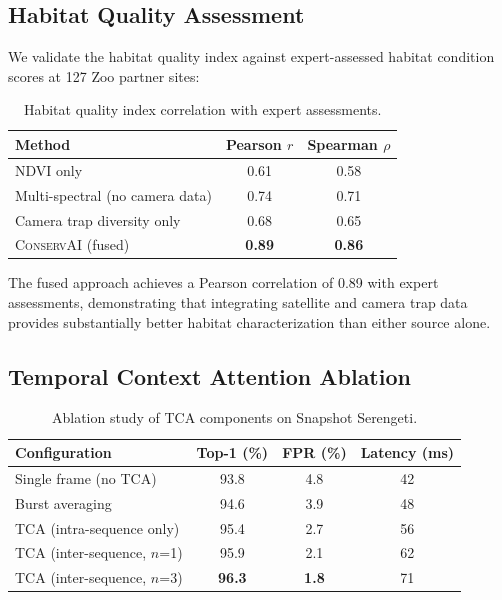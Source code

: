 \documentclass[11pt,letterpaper]{article}
\newcommand{\ConservAI}{\textsc{ConservAI}}
\begin{document}
\subsection{Habitat Quality Assessment}

We validate the habitat quality index against expert-assessed habitat condition scores at 127 Zoo partner sites:

\begin{table}[htbp]
\centering
\caption{Habitat quality index correlation with expert assessments.}
\label{tab:habitat}
\begin{tabular}{lcc}
\toprule
\textbf{Method} & \textbf{Pearson $r$} & \textbf{Spearman $\rho$} \\
\midrule
NDVI only & 0.61 & 0.58 \\
Multi-spectral (no camera data) & 0.74 & 0.71 \\
Camera trap diversity only & 0.68 & 0.65 \\
\ConservAI{} (fused) & \textbf{0.89} & \textbf{0.86} \\
\bottomrule
\end{tabular}
\end{table}

The fused approach achieves a Pearson correlation of 0.89 with expert assessments, demonstrating that integrating satellite and camera trap data provides substantially better habitat characterization than either source alone.

\subsection{Temporal Context Attention Ablation}

\begin{table}[htbp]
\centering
\caption{Ablation study of TCA components on Snapshot Serengeti.}
\label{tab:tca_ablation}
\begin{tabular}{lccc}
\toprule
\textbf{Configuration} & \textbf{Top-1 (\%)} & \textbf{FPR (\%)} & \textbf{Latency (ms)} \\
\midrule
Single frame (no TCA) & 93.8 & 4.8 & 42 \\
Burst averaging & 94.6 & 3.9 & 48 \\
TCA (intra-sequence only) & 95.4 & 2.7 & 56 \\
TCA (inter-sequence, $n$=1) & 95.9 & 2.1 & 62 \\
TCA (inter-sequence, $n$=3) & \textbf{96.3} & \textbf{1.8} & 71 \\
\bottomrule
\end{tabular}
\end{table}
\end{document}
